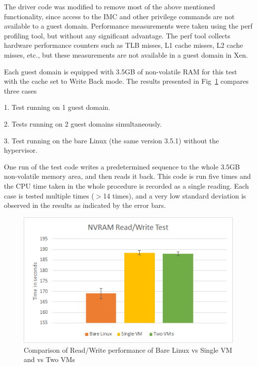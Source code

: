 The driver code was modified to remove most of the above mentioned functionality, since access to the IMC and other privilege commands are not available to a guest domain. Performance measurements were taken using the perf profiling tool, but without any significant advantage. The perf tool collects hardware performance counters such as TLB misses, L1 cache misses, L2 cache misses, etc., but these measurements are not available in a guest domain in Xen.

Each guest domain is equipped with 3.5GB of non-volatile RAM for this test with the cache set to Write Back mode. The results presented in Fig~\ref{fig:result_fig} compares three cases

1. Test running on 1 guest domain.

2. Tests running on 2 guest domains simultaneously.

3. Test running on the bare Linux (the same version 3.5.1) without the hypervisor.

One run of the test code writes a predetermined sequence to the whole 3.5GB non-volatile memory area, and then reads it back. This code is run five times and the CPU time taken in the whole procedure is recorded as a single reading. Each case is tested multiple times ($>$14 times), and a very low standard deviation is observed in the results as indicated by the error bars. 


\begin{figure}[H]
\centering
\includegraphics{figures/read_write_test.png}
\caption{Comparison of Read/Write performance of Bare Linux vs Single VM and vs Two VMs}
\label{fig:result_fig}
\end{figure}



